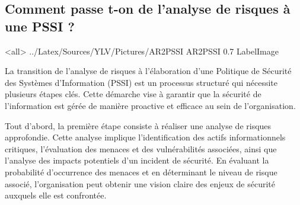 
\subsection{Comment passe t-on de l’analyse de risques à une PSSI ?}

\mode<all>{\picframe
{../Latex/Sources/YLV/Pictures/AR2PSSI}%
{AR2PSSI} %
{0.7} %
{LabelImage} %
}


La transition de l'analyse de risques à l'élaboration d'une Politique de Sécurité des Systèmes d'Information (PSSI) est un processus structuré qui nécessite plusieurs étapes clés. Cette démarche vise à garantir que la sécurité de l'information est gérée de manière proactive et efficace au sein de l'organisation.

Tout d'abord, la première étape consiste à réaliser une analyse de risques approfondie. Cette analyse implique l'identification des actifs informationnels critiques, l'évaluation des menaces et des vulnérabilités associées, ainsi que l'analyse des impacts potentiels d'un incident de sécurité. En évaluant la probabilité d'occurrence des menaces et en déterminant le niveau de risque associé, l'organisation peut obtenir une vision claire des enjeux de sécurité auxquels elle est confrontée.

